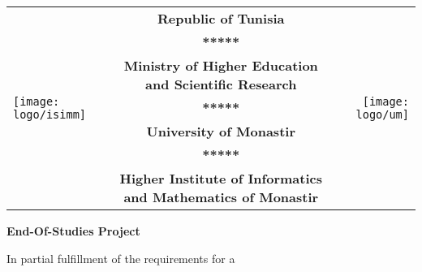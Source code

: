 \begin{titlepage}
    \begin{center}
        \renewcommand\arraystretch{1}
        \fontsize{9}{0.9\baselineskip}\selectfont
        \begin{tabular}{ l c r }
            \multirow[c]{7}{*}{\texttt{[image: logo/isimm]}} & \textbf{Republic of Tunisia}                                         & \multirow[c]{7}{*}{\texttt{[image: logo/um]}} \\
                                                                         & \textbf{*****}                                                                                                                                \\
                                                                         & \textbf{Ministry of Higher Education and Scientific Research}                                                                                 \\
                                                                         & \textbf{*****}                                                                                                                                \\
                                                                         & \textbf{University of Monastir}                                                                                                               \\
                                                                         & \textbf{*****}                                                                                                                                \\
                                                                         & \textbf{Higher Institute of Informatics and Mathematics of Monastir}                                                                          \\
        \end{tabular}

        \vspace{2cm}

        \Huge\textbf{End-Of-Studies Project}

        \vspace{1.5cm}

        \normalsize In partial fulfillment of the requirements for a


\end{center}
\end{titlepage}
